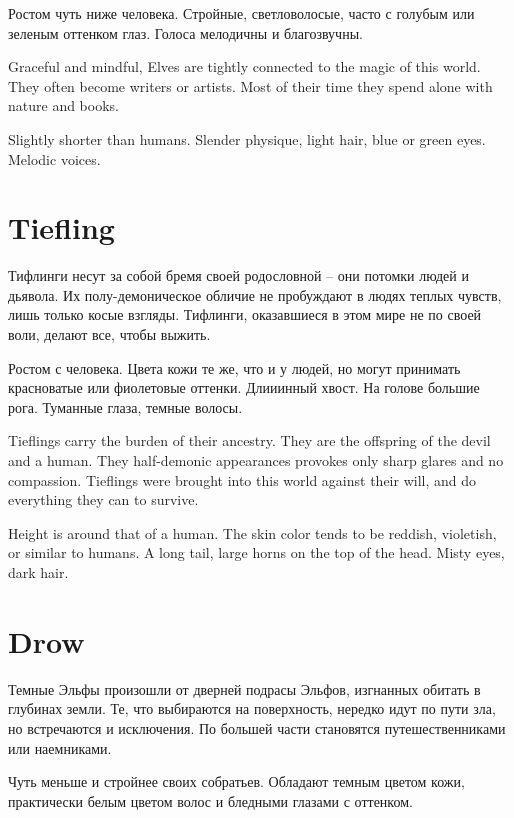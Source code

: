 \documentclass[a5paper,11pt]{book}
\begin{document}
\begin{multicols}{2}
\begin{ru}
Ростом чуть ниже человека. Стройные, светловолосые, часто с голубым или зеленым оттенком глаз. Голоса мелодичны и благозвучны.
\end{ru}

\begin{en}
Graceful and mindful, Elves are tightly connected to the magic of this world. They often become writers or artists. Most of their time they spend alone with nature and books.

Slightly shorter than humans. Slender physique, light hair, blue or green eyes. Melodic voices.
\end{en}

\section{Tiefling}
\begin{ru}
Тифлинги несут за собой бремя своей родословной -- они потомки людей и дьявола. Их полу-демоническое обличие не пробуждают в людях теплых чувств, лишь только косые взгляды. Тифлинги, оказавшиеся в этом мире не по своей воли, делают все, чтобы выжить.

Ростом с человека. Цвета кожи те же, что и у людей, но могут принимать красноватые или фиолетовые оттенки. Длииинный хвост. На голове большие рога. Туманные глаза, темные волосы.
\end{ru}

\begin{en}
Tieflings carry the burden of their ancestry. They are the offspring of the devil and a human. They half-demonic appearances provokes only sharp glares and no compassion. Tieflings were brought into this world against their will, and do everything they can to survive.

Height is around that of a human. The skin color tends to be reddish, violetish, or similar to humans. A long tail, large horns on the top of the head. Misty eyes, dark hair.
\end{en}

\section{Drow}
\begin{ru}
Темные Эльфы произошли от дверней подрасы Эльфов, изгнанных обитать в глубинах земли. Те, что выбираются на поверхность, нередко идут по пути зла, но встречаются и исключения. По большей части становятся путешественниками или наемниками.

Чуть меньше и стройнее своих собратьев. Обладают темным цветом кожи, практически белым цветом волос и бледными глазами с оттенком.
\end{ru}


\end{multicols}
\end{document}
